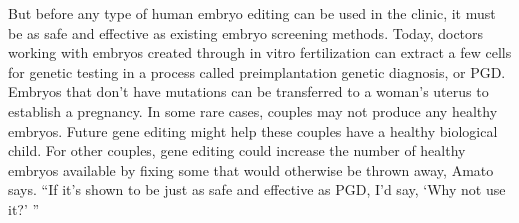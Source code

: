 \documentclass[12pt]{article}
\begin{document}
But before any type of human embryo editing can be used in the clinic, it must be as safe and effective as existing embryo screening methods. Today, doctors working with embryos created through in vitro fertilization can extract a few cells for genetic testing in a process called preimplantation genetic diagnosis, or PGD. Embryos that don’t have mutations can be transferred to a woman’s uterus to establish a pregnancy. In some rare cases, couples may not produce any healthy embryos. Future gene editing might help these couples have a healthy biological child. For other couples, gene editing could increase the number of healthy embryos available by fixing some that would otherwise be thrown away, Amato says. “If it’s shown to be just as safe and effective as PGD, I’d say, ‘Why not use it?’ ”
\end{document}
